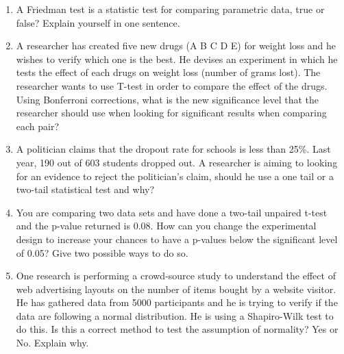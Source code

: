 \documentclass{article}
\newif\ifanswer
\begin{document}
\begin{enumerate}
      \ifanswer
        Solution: 
      $$\lim_{x\rightarrow\infty}F(x)=1$$
  \fi
\item A Friedman test is a statistic test for comparing parametric data,
true or false? Explain yourself in one sentence.

\ifanswer
(Answer: False this is used for comparing non-parametric data, i.e. with a skewed distribution)
\fi

\item A researcher has created five new drugs (A B C D E) for weight loss and he wishes to verify which one is the best. He devises an experiment in which he tests the effect of each drugs on weight loss (number of grams lost). The researcher wants to use T-test in order to compare the effect of the drugs. Using Bonferroni corrections, what is the new significance level that the researcher should use when looking for significant results when comparing each pair?

\ifanswer
(Answer: 0.005/10 because there are 10 comparisons made)
\fi

\item A politician claims that the dropout rate for schools is less
  than 25\%. Last year, 190 out of 603 students dropped out. A
  researcher is aiming to looking for an evidence to reject the
  politician's claim, should he use a one tail or a two-tail
  statistical test and why?

\ifanswer
(Answer: one-tail is enough because the researcher is only interested in one direction. i.e. the dropout rate below 25\%. If the question was \lq{}equal to\rq{} we would use a two-tail test)
\fi

\item You are comparing two data sets and have done a two-tail
  unpaired t-test and the p-value returned is 0.08. How can you change
  the experimental design to increase your chances to have a p-values
  below the significant level of 0.05? Give two possible ways to do
  so.

\ifanswer  
(Answers possible: increase the sample size, used paired data (within subject experiment), design the experiment as one-tail)
\fi

\item One research is performing a crowd-source study to understand
  the effect of web advertising layouts on the number of items bought
  by a website visitor. He has gathered data from 5000 participants
  and he is trying to verify if the data are following a normal
  distribution. He is using a Shapiro-Wilk test to do this. Is this a
  correct method to test the assumption of normality? Yes or
  No. Explain why.


\end{enumerate}
\end{document}
